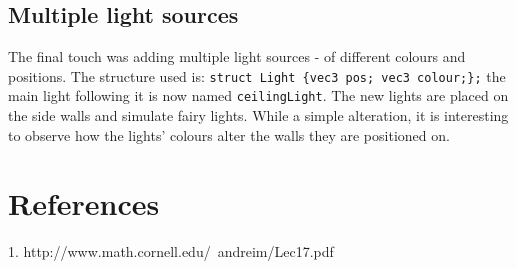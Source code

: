 \documentclass[DIV=calc, paper=a4, fontsize=11pt, twocolumn]{article}	 %
\begin{document}
	\subsection*{Multiple light sources}
	The final touch was adding multiple light sources - of different colours and positions. The structure used is: \texttt{struct Light \{vec3 pos; vec3 colour;\};} the main light following it is now named \texttt{ceilingLight}. The new lights are placed on the side walls and simulate fairy lights. While a simple alteration, it is interesting to observe how the lights' colours alter the walls they are positioned on.
	

	\section*{References}
	1. http://www.math.cornell.edu/~andreim/Lec17.pdf
\end{document}
